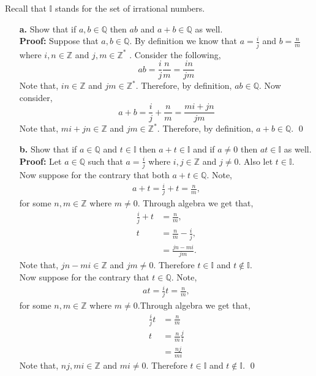 \documentclass[12pt]{article}
\makeatletter
\theoremstyle{homework}
\newenvironment{exercise}[1]
{\def\@currentlabel{#1}\exercisecore}
{\endexercisecore}
\newcommand{\Ints}{\ensuremath{\mathbb Z}}
\newcommand{\Rats}{\ensuremath{\mathbb Q}}
\makeatother
\begin{document}
\begin{exercise}{First Edition 1.4.1}
Recall that $\mathbb{I}$ stands for the set of irrational numbers.
\begin{enumerate}
\item[\textbf{a.}] Show that if $a,b\in\Rats$ then $ab$ and $a+b\in\Rats$ as well.\\
 
\textbf{Proof:} Suppose that $a,b\in\Rats$. By definition we know that $a = \frac{i}{j}$ and $b = \frac{n}{m}$ where $i,n \in \Ints$ and $j,m \in \Ints^*$ .
Consider the following,
\begin{equation*}
  ab = \frac{i}{j}\frac{n}{m} = \frac{in}{jm}
\end{equation*}
Note that, $in \in \Ints$ and $jm \in \Ints^*$. Therefore, by definition, $ab \in \Rats$. Now consider, 
\begin{equation*}
  a+b =  \frac{i}{j}+\frac{n}{m} = \frac{mi + jn}{jm}
\end{equation*}
Note that, $mi + jn \in \Ints$ and $jm \in \Ints^*$. Therefore, by definition, $a+b \in \Rats$. 
\qed


\vspace{.5in}



\item[\textbf{b.}] Show that if $a\in\Rats$ and $t\in\mathbb{I}$ then $a+t\in\mathbb{I}$ and if $a\neq 0$ then $at\in\mathbb{I}$ as well.\\

\textbf{Proof:} Let  $a\in\Rats$ such that $a = \frac{i}{j}$ where $i,j \in \Ints$ and $j \neq 0$. Also let $t\in\mathbb{I}$. Now suppose 
for the contrary that both $a+t \in \Rats$. Note,
\begin{align*}
  a+t = \frac{i}{j} + t = \frac{n}{m}, 
\end{align*}
for some $n,m \in \Ints$ where $m \neq 0$. Through algebra we get that,
\begin{align*}
  \frac{i}{j} + t &= \frac{n}{m},\\
  t &= \frac{n}{m} - \frac{i}{j},\\
  &= \frac{jn - mi}{jm}.
\end{align*}
Note that, $jn - mi \in \Ints$ and $jm \neq 0$. Therefore $t \in \mathbb{I}$ and $t \notin \mathbb{I}$.\\
Now suppose for the contrary that $t\in \Rats$. Note, 
\begin{align*}
  at = \frac{i}{j}t = \frac{n}{m}, 
\end{align*}
for some $n,m \in \Ints$ where $m \neq 0$.Through algebra we get that,
\begin{align*}
  \frac{i}{j}t &= \frac{n}{m}\\
  t &= \frac{n}{m}\frac{j}{i}\\
  &=\frac{nj}{mi}
\end{align*}
Note that, $nj, mi \in \Ints$ and $mi \neq 0$. Therefore $t \in \mathbb{I}$ and $t \notin \mathbb{I}$.
\qed 
\vspace{.5in}





\end{enumerate}
\end{exercise}
\end{document}
